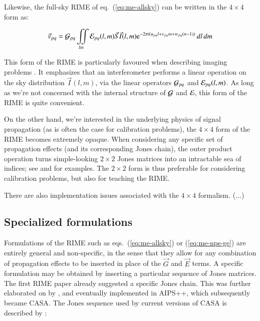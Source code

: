\documentclass[]{aa}
\begin{document}
Likewise, the full-sky RIME of eq.~(\ref{eq:me-allsky}) can be written in the $4\times4$ form as:

    \begin{equation}\label{eq:allsky:mueller}
\vec v_{pq} = {\cal G}_{pq} \iint\limits_{lm} {\cal E}_{pq}(l,m) \vec S \vec I(l,m) {\rm e}^{-2\pi i(u_{pq} l+v_{pq} m+w_{pq} (n-1))} \,dl\,dm 
    \end{equation}

This form of the RIME is particularly favoured when describing imaging problems \citep{SB:imageplane,Rau:DDEs}. It emphasizes that an interferometer performs a linear operation on the sky distribution $\vec I(l,m)$, via the linear operators ${\cal G}_{pq}$ and ${\cal E}_{pq}(l,m)$. As long as we're not concerned with the internal structure of
${\cal G}$ and ${\cal E}$, this form of the RIME is quite convenient. 

On the other hand, we're interested in the underlying physics of signal propagation (as is often the case for calibration problems), the $4\times4$ form of the RIME becomes extremely opaque. When considering any specific set of propagation effects (and its corresponding Jones chain), the outer product operation turns simple-looking $2\times2$ Jones matrices into an intractable sea of indices; see \citet[eq. 4]{SB:imageplane} and \citet[Appendix A]{ME1} for examples. The $2\times2$ form is thus preferable for considering calibration problems, but also for teaching the RIME.

There are also implementation issues associated with the $4\times4$ formalism. (...) 

\subsection{Specialized formulations} 

Formulations of the RIME such as eqs.~(\ref{eq:me-allsky}) or (\ref{eq:me-nps-ge}) are entirely general and non-specific, in the sense that they allow for any combination of propagation effects to be inserted in place of the $\vec G$ and $\vec E$ terms. A specific formulation may be obtained by inserting a particular sequence of Jones matrices. The first RIME paper \citep{ME1} already suggested a specific Jones chain. This was further elaborated on by \citet{JEN:note185}, and eventually implemented in AIPS++, which subsequently became CASA. The Jones sequence used by current versions of CASA is described by \citet[Appendix E.1]{CASA:UserRef}:
\end{document}
